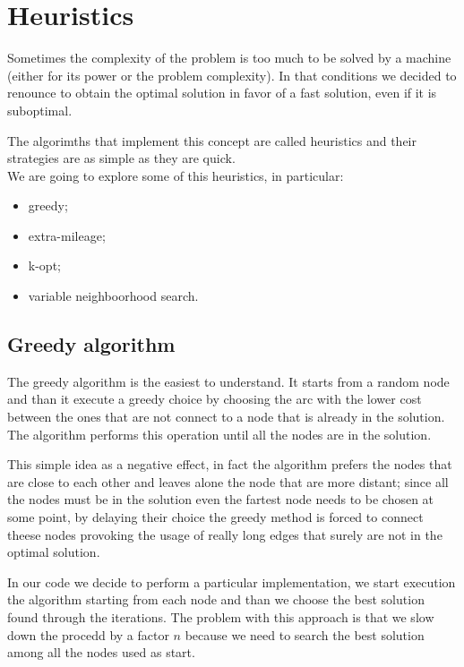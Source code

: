 \section{Heuristics}
\label{sec:heuristics}
Sometimes the complexity of the problem is too much to be solved by a machine (either for its power or the problem complexity). In that conditions we decided to renounce to obtain the optimal solution in favor of a fast solution, even if it is suboptimal.

The algorimths that implement this concept are called heuristics and their strategies are as simple as they are quick. \\
We are going to explore some of this heuristics, in particular:
\begin{itemize}
	\item greedy;
	\item extra-mileage;
	\item k-opt;
	\item variable neighboorhood search.
\end{itemize}

\subsection{Greedy algorithm}
The greedy algorithm is the easiest to understand. It starts from a random node and than it execute a greedy choice by choosing the arc with the lower cost between the ones that are not connect to a node that is already in the solution. The algorithm performs this operation until all the nodes are in the solution.

This simple idea as a negative effect, in fact the algorithm prefers the nodes that are close to each other and leaves alone the node that are more distant; since all the nodes must be in the solution even the fartest node needs to be chosen at some point, by delaying their choice the greedy method is forced to connect theese nodes provoking the usage of really long edges that surely are not in the optimal solution.

In our code we decide to perform a particular implementation, we start execution the algorithm starting from each node and than we choose the best solution found through the iterations. The problem with this approach is that we slow down the procedd by a factor $n$ because we need to search the best solution among all the nodes used as start.


